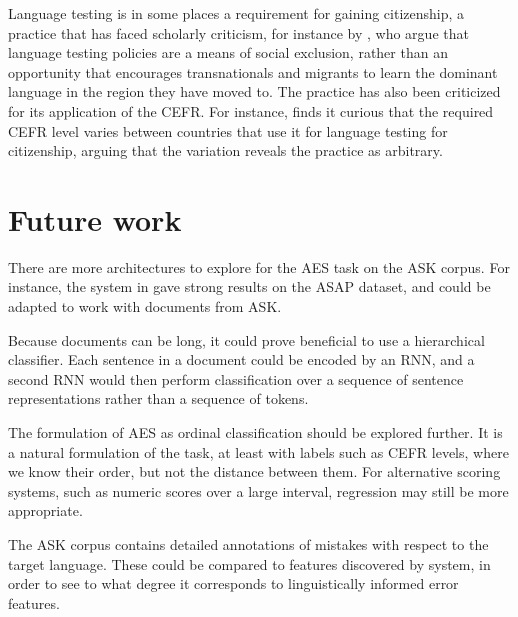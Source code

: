Language testing is in some places a requirement for gaining citizenship, a
practice that has faced scholarly criticism, for instance by
\textcite[162]{weberhorner}, who argue that language testing policies are a
means of social exclusion, rather than an opportunity that encourages
transnationals and migrants to learn the dominant language in the region they
have moved to. The practice has also been criticized for its application of
the \ac{CEFR}. For instance, \textcite{van2009fortress} finds it curious that
the required CEFR level varies between countries that use it for language
testing for citizenship, arguing that the variation reveals the practice as
arbitrary.


\section{Future work}

There are more architectures to explore for the \ac{AES} task on the ASK corpus.
For instance, the system in \textcite{alikaniotis2016automatic} gave strong
results on the ASAP dataset, and could be adapted to work with documents from
ASK.

Because documents can be long, it could prove beneficial to use a
hierarchical classifier. Each sentence in a document could be encoded by an
RNN, and a second RNN would then perform classification over a sequence of
sentence representations rather than a sequence of tokens.

The formulation of \ac{AES} as ordinal classification should be explored
further. It is a natural formulation of the task, at least with labels such
as \ac{CEFR} levels, where we know their order, but not the distance between
them. For alternative scoring systems, such as numeric scores over a large
interval, regression may still be more appropriate.

The ASK corpus contains detailed annotations of mistakes with respect to the
target language. These could be compared to features discovered by 
system, in order to see to what degree it corresponds to linguistically
informed error features.
